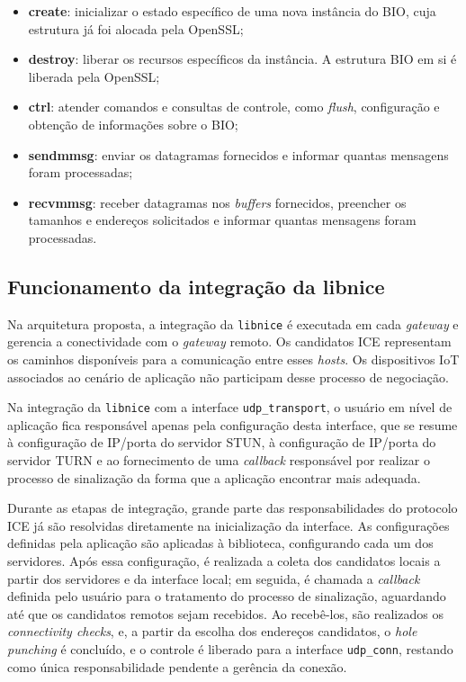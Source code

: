 \begin{itemize}
    \item \textbf{create}: inicializar o estado específico de uma nova instância do BIO, cuja estrutura já foi alocada pela OpenSSL;
    \item \textbf{destroy}: liberar os recursos específicos da instância. A estrutura BIO em si é liberada pela OpenSSL;
    \item \textbf{ctrl}: atender comandos e consultas de controle, como \textit{flush}, configuração e obtenção de informações sobre o BIO;
    \item \textbf{sendmmsg}: enviar os datagramas fornecidos e informar quantas mensagens foram processadas;
    \item \textbf{recvmmsg}: receber datagramas nos \textit{buffers} fornecidos, preencher os tamanhos e endereços solicitados e informar quantas mensagens foram processadas.
\end{itemize}

\subsection{Funcionamento da integração da libnice}

Na arquitetura proposta, a integração da \texttt{libnice} é executada em cada \textit{gateway} e gerencia a conectividade com o \textit{gateway} remoto. Os candidatos ICE representam os caminhos disponíveis para a comunicação entre esses \textit{hosts}. Os dispositivos IoT associados ao cenário de aplicação não participam desse processo de negociação. 

Na integração da \texttt{libnice} com a interface \texttt{udp\_transport}, o usuário em nível de aplicação fica responsável apenas pela configuração desta interface, que se resume à configuração de IP/porta do servidor STUN, à configuração de IP/porta do servidor TURN e ao fornecimento de uma \textit{callback} responsável por realizar o processo de sinalização da forma que a aplicação encontrar mais adequada.

Durante as etapas de integração, grande parte das responsabilidades do protocolo ICE já são resolvidas diretamente na inicialização da interface. As configurações definidas pela aplicação são aplicadas à biblioteca, configurando cada um dos servidores. Após essa configuração, é realizada a coleta dos candidatos locais a partir dos servidores e da interface local; em seguida, é chamada a \textit{callback} definida pelo usuário para o tratamento do processo de sinalização, aguardando até que os candidatos remotos sejam recebidos. Ao recebê-los, são realizados os \textit{connectivity checks}, e, a partir da escolha dos endereços candidatos, o \textit{hole punching} é concluído, e o controle é liberado para a interface \texttt{udp\_conn}, restando como única responsabilidade pendente a gerência da conexão.


